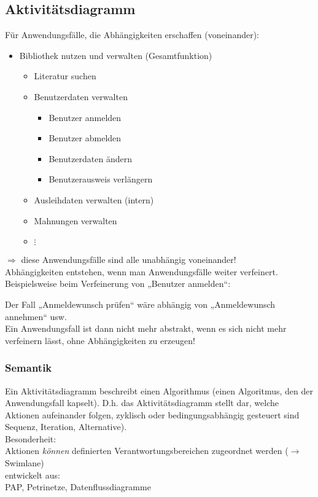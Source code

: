\subsection{Aktivitätsdiagramm}
Für Anwendungsfälle, die Abhängigkeiten erschaffen (voneinander):
\begin{itemize}
\item Bibliothek nutzen und verwalten (Gesamtfunktion)
\begin{itemize}
\item Literatur suchen
\item Benutzerdaten verwalten
\begin{itemize}
\item Benutzer anmelden
\item Benutzer abmelden
\item Benutzerdaten ändern
\item Benutzerausweis verlängern
\end{itemize}
\item Ausleihdaten verwalten (intern)
\item Mahnungen verwalten
\item[] $\vdots$
\end{itemize}
\end{itemize}
$\Rightarrow$ diese Anwendungsfälle sind alle unabhängig voneinander!\\
Abhängigkeiten entstehen, wenn man Anwendungsfälle weiter verfeinert. Beispielsweise beim Verfeinerung von „Benutzer anmelden“: 

Der Fall „Anmeldewunsch prüfen“ wäre abhängig von „Anmeldewunsch annehmen“ usw.\\
Ein Anwendungsfall ist dann nicht mehr abstrakt, wenn es sich nicht mehr verfeinern lässt, ohne Abhängigkeiten zu erzeugen!

\subsubsection{Semantik}
Ein Aktivitätsdiagramm beschreibt einen Algorithmus (einen Algoritmus, den der Anwendungsfall kapselt). D.h. das Aktivitätsdiagramm stellt dar, welche Aktionen aufeinander folgen, zyklisch oder bedingungsabhängig gesteuert sind Sequenz, Iteration, Alternative).\\
Besonderheit: \\
Aktionen \emph{können} definierten Verantwortungsbereichen zugeordnet werden ($\to$ Swimlane)\\
entwickelt aus:\\
PAP, Petrinetze, Datenflussdiagramme

